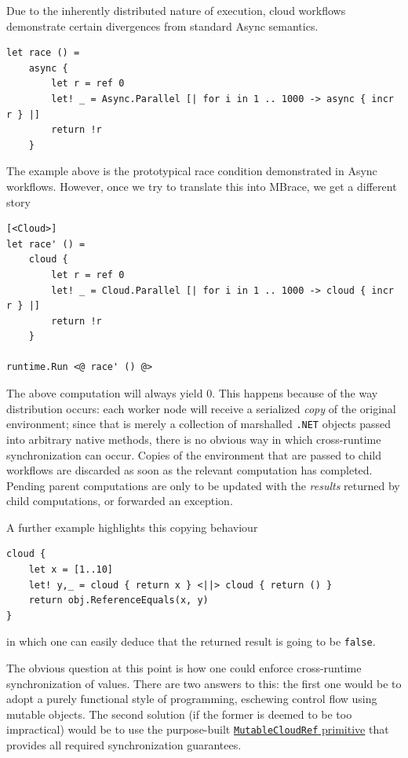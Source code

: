 \documentclass[9pt,a4paper]{article}
\newcommand{\mbrace}{MBrace}
\newcommand{\dotnet}{\texttt{\hbox{.}NET}}
\begin{document}
Due to the inherently distributed nature of execution, cloud workflows demonstrate
certain divergences from standard Async semantics.
\begin{lstlisting}
let race () =
    async {
        let r = ref 0
        let! _ = Async.Parallel [| for i in 1 .. 1000 -> async { incr r } |]
        return !r
    }
\end{lstlisting}
The example above is the prototypical race condition demonstrated in Async workflows.
However, once we try to translate this into \mbrace, we get a different story
\begin{lstlisting}
[<Cloud>]
let race' () =
    cloud {
        let r = ref 0
        let! _ = Cloud.Parallel [| for i in 1 .. 1000 -> cloud { incr r } |]
        return !r
    }

runtime.Run <@ race' () @>
\end{lstlisting}
The above computation will always yield 0. This happens because of the way distribution
occurs: each worker node will receive a serialized \emph{copy} of the original environment;
since that is merely a collection of marshalled \dotnet{} objects passed into arbitrary
native methods, there is no obvious way in which cross-runtime synchronization can occur.
Copies of the environment that are passed to child workflows are discarded as soon as the
relevant computation has completed. Pending parent computations are only to be updated with
the \emph{results} returned by child computations, or forwarded an exception.

A further example highlights this copying behaviour
\begin{lstlisting}
cloud {
    let x = [1..10]
    let! y,_ = cloud { return x } <||> cloud { return () }
    return obj.ReferenceEquals(x, y)
}
\end{lstlisting}
in which one can easily deduce that the returned result is going to be \texttt{false}.

The obvious question at this point is how one could enforce cross-runtime
synchronization of values. There are two answers to this: the first one would be
to adopt a purely functional style of programming, eschewing control flow using mutable
objects. The second solution (if the former is deemed to be too impractical) would be
to use the purpose-built \hyperref[mutableCloudRef]{\texttt{MutableCloudRef} primitive} that 
provides all required synchronization guarantees.
\end{document}
